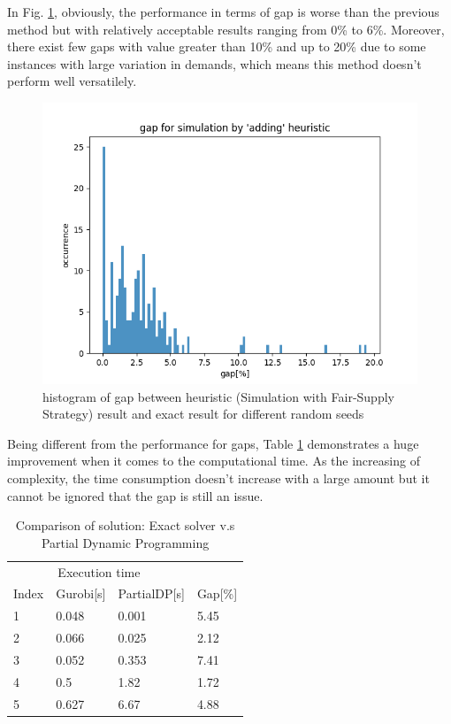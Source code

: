 \documentclass{article}
\begin{document}
In Fig. \ref{fig:hist_so}, obviously, the performance in terms of gap is worse than the previous method but with relatively acceptable results ranging from 0\% to 6\%. Moreover, there exist few gaps with value greater than 10\% and up to 20\% due to some instances with large variation in demands, which means this method doesn't perform well versatilely.

\begin{figure}[ht]
    \centering
    \includegraphics[scale=0.7]{hist_so.png}
    \caption{histogram of gap between heuristic (Simulation with Fair-Supply Strategy) result and exact result for different random seeds}
    \label{fig:hist_so}
\end{figure}

Being different from the performance for gaps, Table \ref{tab:exact_heu2} demonstrates a huge improvement when it comes to the computational time. As the increasing of complexity, the time consumption doesn't increase with a large amount but it cannot be ignored that the gap is still an issue.

\begin{table}[ht]
 \caption{Comparison of solution: Exact solver v.s Partial Dynamic Programming}
  \centering
  \begin{tabular}{llll}
    \toprule
    \multicolumn{3}{c}{Execution time}                   \\
    \cmidrule(r){2-3}
    Index   & Gurobi[s]     & PartialDP[s]      & Gap[\%] \\
    \midrule
    1	&	0.048	&	0.001	&	5.45	\\
    2	&	0.066	&	0.025	&	2.12	\\
    3	&	0.052	&	0.353	&	7.41	\\
    4	&	0.5	&	1.82	&	1.72	\\
    5	&	0.627	&	6.67	&	4.88	\\
    \bottomrule
  \end{tabular}
  \label{tab:exact_heu2}
\end{table}
\end{document}
